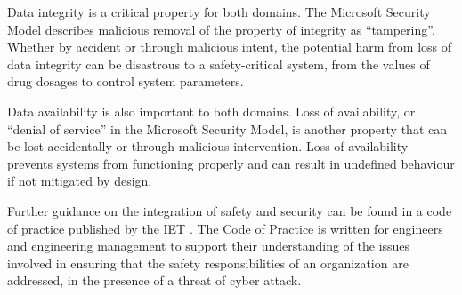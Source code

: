 Data \gls{integrity} is a critical property for both domains. The Microsoft Security Model describes malicious removal of the property of \gls{integrity} as ``tampering''. Whether by accident or through malicious intent, the potential harm from loss of data \gls{integrity} can be disastrous to a safety-critical system, from the values of drug dosages to control system parameters. 

Data \gls{availability} is also important to both domains. Loss of \gls{availability}, or ``denial of service'' in the Microsoft Security Model, is another property that can be lost accidentally or through malicious intervention. Loss of \gls{availability} prevents systems from functioning properly and can result in undefined behaviour if not mitigated by design.

Further guidance on the integration of safety and security can be found in a code of practice published by the IET
\cite{citation:IetCyber}.
The Code of Practice is written for engineers and engineering management to support their understanding of the issues
involved in ensuring that the safety responsibilities of an organization are addressed, in the presence of a threat of
cyber attack.
